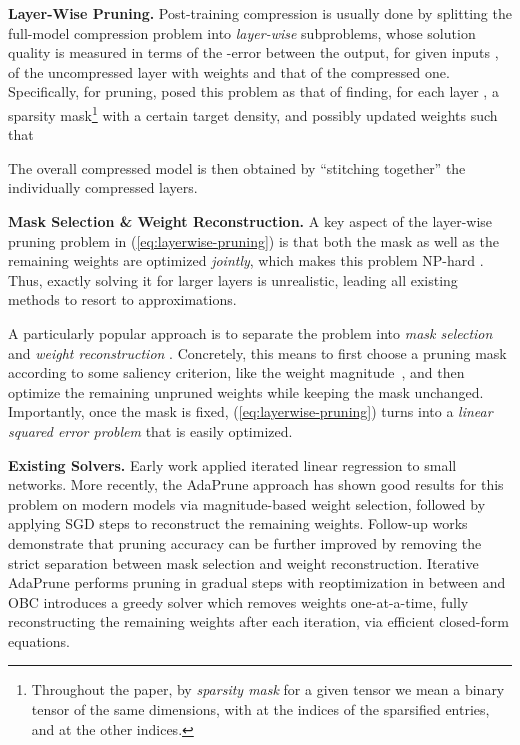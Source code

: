 \documentclass{article}
\theoremstyle{plain}
\theoremstyle{definition}
\theoremstyle{remark}
\renewcommand{\paragraph}[1]{\vspace{-0.1em} \noindent \textbf{#1}}
\begin{document}
\paragraph{Layer-Wise Pruning.} Post-training compression is usually done by splitting the full-model compression problem into \emph{layer-wise} subproblems, whose solution quality is measured in terms of the -error between the output, for given inputs , of the uncompressed layer with weights  and that of the compressed one. Specifically, for pruning, \cite{hubara2021accelerated} posed this problem as that of finding, for each layer , a sparsity mask\footnote{Throughout the paper, by \emph{sparsity mask} for a given tensor we mean a binary tensor of the same dimensions, with  at the indices of the sparsified entries, and  at the other indices.}  with a certain target density, and possibly updated weights  such that 

The overall compressed model is then obtained by ``stitching together'' the individually compressed layers.

\paragraph{Mask Selection \& Weight Reconstruction.} A key aspect of the layer-wise pruning problem in (\ref{eq:layerwise-pruning}) is that both the mask  as well as the remaining weights  are optimized \emph{jointly}, which makes this problem NP-hard \cite{blumensath2008iterative}. Thus, exactly solving it for larger layers is unrealistic, leading all existing methods to resort to approximations.

A particularly popular approach is to separate the problem into \emph{mask selection} and \emph{weight reconstruction} \cite{he2018amc, kwon2022fast, hubara2021accelerated}. Concretely, this means to first choose a pruning mask  according to some saliency criterion, like the weight magnitude~\cite{zhu2017prune}, and then optimize the remaining unpruned weights while keeping the mask unchanged. Importantly, once the mask is fixed, (\ref{eq:layerwise-pruning}) turns into a \textit{linear squared error problem} that is easily optimized.

\paragraph{Existing Solvers.} Early work \cite{Kingdon1997} applied iterated linear regression to small networks. More recently, the AdaPrune approach \cite{hubara2021accelerated} has shown good results for this problem on modern models via magnitude-based weight selection, followed by applying SGD steps to reconstruct the remaining weights. Follow-up works demonstrate that pruning accuracy can be further improved by removing the strict separation between mask selection and weight reconstruction. Iterative AdaPrune \cite{frantar2022spdy} performs pruning in gradual steps with reoptimization in between and OBC \cite{frantar2022obc} introduces a greedy solver which removes weights one-at-a-time, fully reconstructing the remaining weights after each iteration, via efficient closed-form equations.
\end{document}
